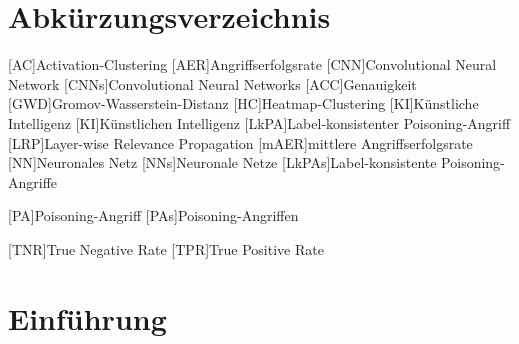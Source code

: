 \documentclass[twoside, 12pt,a4paper]{book}
\numberwithin{equation}{section}
\begin{document}
	\chapter*{Abkürzungsverzeichnis}
	\begin{acronym}[mAER]
		
		[AC]{Activation-Clustering}
		[AER]{Angriffserfolgsrate}
		[CNN]{Convolutional Neural Network}
		{Convolutional Neural Networks}
		[ACC]{Genauigkeit}
		[GWD]{Gromov-Wasserstein-Distanz}
		[HC]{Heatmap-Clustering}
		[KI]{Künst\-li\-che In\-tel\-li\-genz}
		[KI]{Künst\-li\-chen In\-tel\-li\-genz}
		{Label-konsistenter Poisoning-Angriff}
		[LRP]{Layer-wise Relevance Propagation}
		{mittlere Angriffserfolgsrate}
		[NN]{Neuronales Netz}
		[NNs]{Neuronale Netze}
		[LkPAs]{Label-konsistente Poisoning-Angriffe}
		
		[PA]{Poisoning-Angriff}
		[PAs]{Poisoning-Angriffen}
		
		
		[TNR]{True Negative Rate}
		[TPR]{True Positive Rate}
		
		
		
	\end{acronym}
	
	\chapter{Einführung}
	
\end{document}

